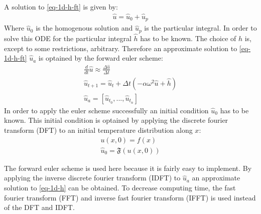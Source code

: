 A solution to \ref{eq-1d-h-ft} is given by:
\begin{gather}
\hat{u} = \hat{u}_{0} + \hat{u}_{p}
\end{gather}
Where \(\hat{u}_{0}\) is the homogenous solution and \(\hat{u}_{p}\) is the particular integral.
In order to solve this ODE for the particular integral \(\hat{h}\) has to be known. \cite{Papula2015}
The choice of \(h\) is, except to some restrictions, arbitrary.
Therefore an approximate solution to \ref{eq-1d-h-ft} \(\hat{u}_{a}\) is optained by the forward euler scheme:
\begin{gather}
\frac{d}{dt} \hat{u} \approx \frac{\Delta \hat{u}}{\Delta t} \\
\hat{u}_{t+1} = \hat{u}_{t} + \Delta t (-\alpha\omega^{2}\hat{u} + \hat{h}) \label{eq-1d-h-es} \\
\hat{u}_{a} = [\hat{u}_{t_{0}}, ..., \hat{u}_{t_{n}}]
\end{gather}
In order to apply the euler scheme successfully an initial condition   \(\hat{u}_{0}\) has to be known. 
This initial condition is optained by applying the discrete fourier transform (DFT) to an initial temperature distribution along \(x\):
\begin{gather}
u(x, 0) = f(x) \\
\hat{u}_{0} = \mathfrak{F}(u(x, 0)) 
\end{gather} 
\cite{Gustafsson2011b}

The forward euler scheme is used here because it is fairly easy to implement.
By applying the  inverse discrete fourier transform (IDFT) to \(\hat{u}_{a}\) an approximate solution to \ref{eq-1d-h} can be obtained.
To decrease computing time, the fast fourier transform (FFT) and inverse fast fourier transform (IFFT) is used instead of the DFT and IDFT.

